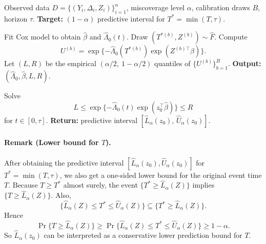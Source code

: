 \documentclass[11pt]{article}
\begin{document}
\begin{algorithm}[H]
\caption{Conformal Predictive Interval for $T^*$ under Finite Observation Window}
\label{alg:rcensored}
\begin{algorithmic}[1]

\Require Observed data $D=\{(Y_i,\Delta_i,Z_i)\}_{i=1}^n$, miscoverage level $\alpha$, calibration draws $B$, horizon $\tau$.
\Statex \textbf{Target:} $(1-\alpha)$ predictive interval for $T^*=\min(T,\tau)$.

    \State Fit Cox model to obtain $\widehat\beta$ and $\widehat\Lambda_0(t)$.
        \State Draw $(T^{*(b)},Z^{(b)}) \sim \widehat F$.
        \State Compute
        \[
        U^{(b)}=\exp\{-\widehat\Lambda_0(T^{*(b)})\exp(Z^{(b)\top}\widehat\beta)\}.
        \]
    \EndFor
    \State Let $(L,R)$ be the empirical $(\alpha/2,\ 1-\alpha/2)$ quantiles of $\{U^{(b)}\}_{b=1}^B$.
    \State \textbf{Output:} $(\widehat\Lambda_0,\widehat\beta,L,R)$.
\EndProcedure

\Statex
{}
    \State Solve
    \[
    L \le \exp\{-\widehat\Lambda_0(t)\exp(z_0^\top\widehat\beta)\} \le R
    \]
    for $t \in [0,\tau]$.
    \State \textbf{Return:} predictive interval $[\widehat L_\alpha(z_0),\,\widehat U_\alpha(z_0)]$.
\EndFunction

\end{algorithmic}
\end{algorithm}

{\color{blue}
\paragraph{Remark (Lower bound for $T$).}
After obtaining the predictive interval
$[\widehat L_\alpha(z_0),\widehat U_\alpha(z_0)]$ for $T^*=\min(T,\tau)$, we also get
a one-sided lower bound for the original event time $T$.
Because $T\ge T^*$ almost surely, the event
$\{T^*\ge \widehat L_\alpha(Z)\}$ implies $\{T\ge \widehat L_\alpha(Z)\}$.
Also,
\[
\{\widehat L_\alpha(Z)\le T^*\le \widehat U_\alpha(Z)\}
\subseteq
\{T^*\ge \widehat L_\alpha(Z)\}.
\]
Hence
\[
\Pr\{T\ge \widehat L_\alpha(Z)\}
\ge
\Pr\{\widehat L_\alpha(Z)\le T^*\le \widehat U_\alpha(Z)\}
\ge 1-\alpha.
\]
So $\widehat L_\alpha(z_0)$ can be interpreted as a conservative lower prediction
bound for $T$.
}
\end{document}
